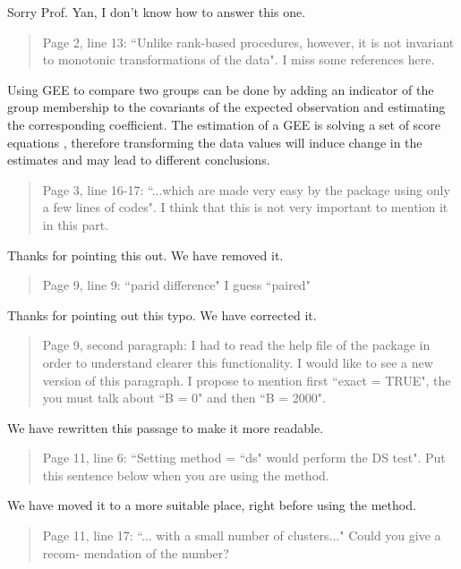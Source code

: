 \documentclass[12pt]{article}
\newenvironment{comment}%
{\begin{quotation}\noindent\small\it\ignorespaces%
  }{\end{quotation}}
\begin{document}
Sorry Prof. Yan, I don't know how to answer this one.

\begin{comment}
Page 2, line 13: ``Unlike rank-based procedures, however, it is not
invariant to monotonic transformations of the data". I miss some
references here.
\end{comment}

Using GEE to compare two groups can be done by adding an indicator of the
group membership to the covariants of the expected observation and
estimating the corresponding coefficient. The estimation of a GEE is solving a set
of score equations , therefore transforming the data values will induce
change in the estimates and may lead to different conclusions.

\begin{comment}
Page 3, line 16-17: ``...which are made very easy by the package using only a few
lines of codes". I think that this is not very important to mention it in this part.
\end{comment}

Thanks for pointing this out. We have removed it.

\begin{comment}
Page 9, line 9: ``parid difference" I guess ``paired"
\end{comment}

Thanks for pointing out this typo. We have corrected it.

\begin{comment}
Page 9, second paragraph: I had to read the help file of the package in
order to understand clearer this functionality.
I would like to see a new version of this paragraph.
I propose to mention first ``exact = TRUE", the you must talk about ``B = 0" and
then ``B = 2000".
\end{comment}

We have rewritten this passage to make it more readable.

\begin{comment}
Page 11, line 6: ``Setting method = ``ds" would perform the DS test". Put this
sentence below when you are using the method.
\end{comment}

We have moved it to a more suitable place, right before using the method.

\begin{comment}
Page 11, line 17: ``... with a small number of clusters..." Could you give a recom-
mendation of the number?
\end{comment}
\end{document}
